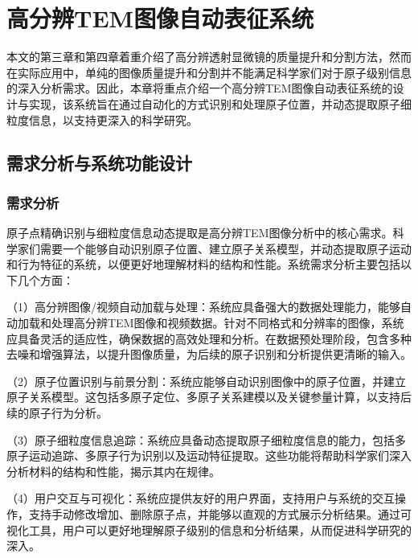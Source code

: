 \chapter{高分辨TEM图像自动表征系统}
本文的第三章和第四章着重介绍了高分辨透射显微镜的质量提升和分割方法，然而在实际应用中，单纯的图像质量提升和分割并不能满足科学家们对于原子级别信息的深入分析需求。因此，本章将重点介绍一个高分辨TEM图像自动表征系统的设计与实现，该系统旨在通过自动化的方式识别和处理原子位置，并动态提取原子细粒度信息，以支持更深入的科学研究。

\section{需求分析与系统功能设计}
\subsection{需求分析}
原子点精确识别与细粒度信息动态提取是高分辨TEM图像分析中的核心需求。科学家们需要一个能够自动识别原子位置、建立原子关系模型，并动态提取原子运动和行为特征的系统，以便更好地理解材料的结构和性能。系统需求分析主要包括以下几个方面：

（1）高分辨图像/视频自动加载与处理：系统应具备强大的数据处理能力，能够自动加载和处理高分辨TEM图像和视频数据。针对不同格式和分辨率的图像，系统应具备灵活的适应性，确保数据的高效处理和分析。在数据预处理阶段，包含多种去噪和增强算法，以提升图像质量，为后续的原子识别和分析提供更清晰的输入。

（2）原子位置识别与前景分割：系统应能够自动识别图像中的原子位置，并建立原子关系模型。这包括多原子定位、多原子关系建模以及关键参量计算，以支持后续的原子行为分析。

（3）原子细粒度信息追踪：系统应具备动态提取原子细粒度信息的能力，包括多原子运动追踪、多原子行为识别以及运动特征提取。这些功能将帮助科学家们深入分析材料的结构和性能，揭示其内在规律。

（4）用户交互与可视化：系统应提供友好的用户界面，支持用户与系统的交互操作，支持手动修改增加、删除原子点，并能够以直观的方式展示分析结果。通过可视化工具，用户可以更好地理解原子级别的信息和分析结果，从而促进科学研究的深入。

